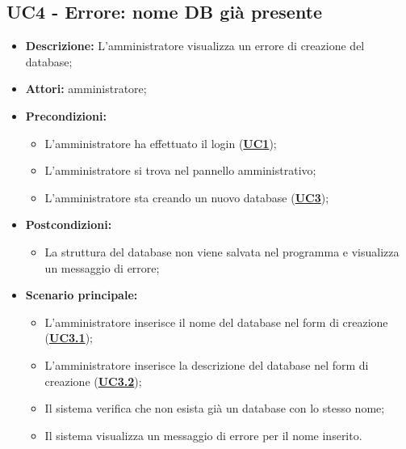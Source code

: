 \subsection{UC4 - Errore: nome DB già presente}
\label{sec:UC4}
\begin{itemize}
	\item \textbf{Descrizione:} L’amministratore visualizza un errore di creazione del database;
	\item \textbf{Attori:} amministratore;
	\item \textbf{Precondizioni:} 
	\begin{itemize}
		\item L’amministratore ha effettuato il login (\hyperref[sec:UC1]{\textbf{UC1}});
		\item L’amministratore si trova nel pannello amministrativo;
		\item L’amministratore sta creando un nuovo database (\hyperref[sec:UC3]{\textbf{UC3}});
	\end{itemize}
	\item \textbf{Postcondizioni:} 
	\begin{itemize}
		\item La struttura del database non viene salvata nel programma e visualizza un messaggio di errore;
	\end{itemize}
	\item \textbf{Scenario principale:} 
	\begin{itemize}
		\item L’amministratore inserisce il nome del database nel form di creazione (\hyperref[sec:UC3.1]{\textbf{UC3.1}});
		\item L’amministratore inserisce la descrizione del database nel form di creazione (\hyperref[sec:UC3.2]{\textbf{UC3.2}});
		\item Il sistema verifica che non esista già un database con lo stesso nome;
		\item Il sistema visualizza un messaggio di errore per il nome inserito.
	\end{itemize}
\end{itemize}


